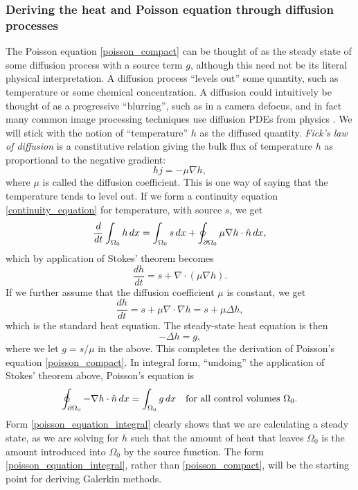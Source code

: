 \subsubsection{Deriving the heat and Poisson equation through diffusion processes}
The Poisson equation \eqref{poisson_compact} can be thought of as the steady state of some diffusion process with a source term $g$,
although this need not be its literal physical interpretation.
A diffusion process ``levels out'' some quantity, such as temperature or some chemical concentration.
A diffusion could intuitively be thought of as a
progressive ``blurring'',
such as in a camera defocus, and in fact many common image processing techniques use diffusion PDEs from physics \cite{tum}. We will stick with
the notion of ``temperature'' $h$ as the diffused quantity.
\textit{Fick's law of diffusion} is a constitutive relation giving the bulk flux of temperature $h$ as proportional to the negative gradient:
    $$hj = -\mu\nabla h,$$
where $\mu$ is called the diffusion coefficient.
This is one way of saying that the temperature tends to level out.
If we form a continuity equation \eqref{continuity_equation} for temperature, with source $s$, we get
\begin{equation}\label{heat_equation_integral}
    \frac{d}{dt} \int_{\Omega_0} h\,dx = \int_{\Omega_0} s\,dx + \oint_{{\partial\Omega_0}} \mu \nabla h \cdot \hat{n}\,dx,
\end{equation}
which by application of Stokes' theorem becomes
\begin{equation}\label{heat_equation_differential}
    \frac{dh}{dt} = s + \nabla \cdot \left(\mu \nabla h\right).
\end{equation}
If we further assume that the diffusion coefficient $\mu$ is constant, we get
\begin{equation}\label{heat_equation_differential_constant}
    \frac{dh}{dt} = s + \mu\nabla \cdot \nabla h = s + \mu\Delta h,
\end{equation}
which is the standard heat equation.
The steady-state heat equation is then
\begin{equation}\label{poisson_equation}
    -\Delta h = g,
\end{equation}
where we let $g = s/\mu$ in the above.
This completes the derivation of Poisson's equation \eqref{poisson_compact}.
In integral form, ``undoing'' the application of Stokes' theorem above, Poisson's equation is
\begin{equation}\label{poisson_equation_integral}
    \oint_{{\partial\Omega_0}} -\nabla h\cdot \hat{n}\,dx = \int_{{\Omega_0}} g\,dx \quad \text{for all control volumes $\Omega_0$.}
\end{equation}
Form \eqref{poisson_equation_integral} clearly shows that we are calculating a steady state,
as we are solving for $h$ such that the amount of heat that leaves $\Omega_0$ is the amount introduced into $\Omega_0$ by the source function.
The form \eqref{poisson_equation_integral}, rather than \eqref{poisson_compact}, will be the starting point for deriving Galerkin methods.

